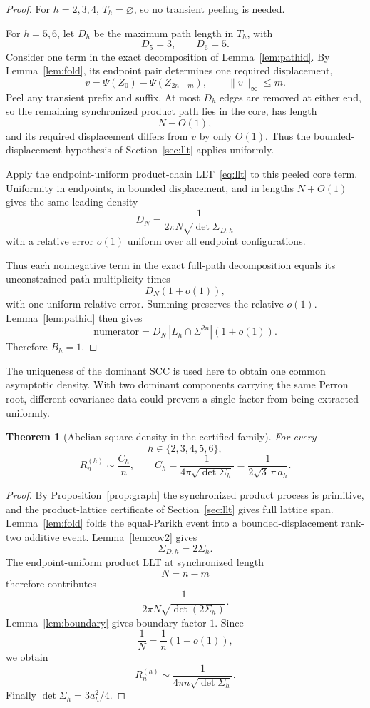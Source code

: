 \documentclass[12pt]{article}
\newtheorem{theorem}{Theorem}[section]
\theoremstyle{definition}
\begin{document}
\begin{proof}
For \(h=2,3,4\), \(T_h=\varnothing\), so no transient peeling is needed.

For \(h=5,6\), let \(D_h\) be the maximum path length in \(T_h\), with
\[
D_5=3,\qquad D_6=5.
\]
Consider one term in the exact decomposition of Lemma~\ref{lem:pathid}. By Lemma~\ref{lem:fold}, its endpoint pair determines one required displacement,
\[
v=\Psi(Z_0)-\Psi(Z_{2n-m}),
\qquad
\|v\|_\infty\le m.
\]
Peel any transient prefix and suffix. At most \(D_h\) edges are removed at either end, so the remaining synchronized product path lies in the core, has length
\[
N-O(1),
\]
and its required displacement differs from \(v\) by only \(O(1)\). Thus the bounded-displacement hypothesis of Section~\ref{sec:llt} applies uniformly.

Apply the endpoint-uniform product-chain LLT~\eqref{eq:llt} to this peeled core term. Uniformity in endpoints, in bounded displacement, and in lengths \(N+O(1)\) gives the same leading density
\[
D_N
=
\frac{1}{2\pi N\sqrt{\det\Sigma_{D,h}}}
\]
with a relative error \(o(1)\) uniform over all endpoint configurations.

Thus each nonnegative term in the exact full-path decomposition equals its unconstrained path multiplicity times
\[
D_N(1+o(1)),
\]
with one uniform relative error. Summing preserves the relative \(o(1)\). Lemma~\ref{lem:pathid} then gives
\[
\text{numerator}
=
D_N\,|L_h\cap\Sigma^{2n}|(1+o(1)).
\]
Therefore \(B_h=1\).
\end{proof}

The uniqueness of the dominant SCC is used here to obtain one common asymptotic density. With two dominant components carrying the same Perron root, different covariance data could prevent a single factor from being extracted uniformly.

\begin{theorem}[Abelian-square density in the certified family]
\label{thm:main}
For every
\[
h\in\{2,3,4,5,6\},
\]
\[
\boxed{
R_n^{(h)}
\sim
\frac{C_h}{n},
\qquad
C_h
=
\frac{1}{4\pi\sqrt{\det\Sigma_h}}
=
\frac{1}{2\sqrt3\,\pi\,a_h}.
}
\]
\end{theorem}

\begin{proof}
By Proposition~\ref{prop:graph} the synchronized product process is primitive, and the product-lattice certificate of Section~\ref{sec:llt} gives full lattice span. Lemma~\ref{lem:fold} folds the equal-Parikh event into a bounded-displacement rank-two additive event. Lemma~\ref{lem:cov2} gives
\[
\Sigma_{D,h}=2\Sigma_h.
\]
The endpoint-uniform product LLT at synchronized length
\[
N=n-m
\]
therefore contributes
\[
\frac{1}{2\pi N\sqrt{\det(2\Sigma_h)}}.
\]
Lemma~\ref{lem:boundary} gives boundary factor \(1\). Since
\[
\frac1N=\frac1n(1+o(1)),
\]
we obtain
\[
R_n^{(h)}
\sim
\frac{1}{4\pi n\sqrt{\det\Sigma_h}}.
\]
Finally \(\det\Sigma_h=3a_h^2/4\).
\end{proof}
\end{document}
